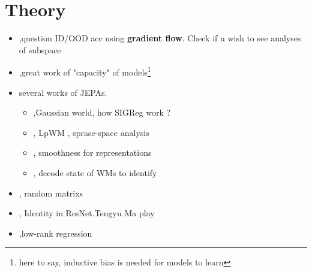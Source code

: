 \section{Theory}
\begin{itemize}
    \item \cite{kumar2022finetuning},question ID/OOD acc using \textbf{gradient flow}. Check if u wish to see analyses of subspace
    \item \cite{papadopoulos2024arrows},great work of "capacity" of models\footnote{here to say, inductive bias is needed for models to learn}
    \item several works of JEPAs.
    \begin{itemize}
        \item \cite{klindt2026when},Gaussian world, how SIGReg work ?
        \item \cite{kuang2026lpwm}, LpWM , sprase-space analysis 
        \item \cite{wang2026temporal}, smoothness for representations
        \item \cite{zhang2026identifiability}, decode state of WMs to identify
    \end{itemize}
    \item \cite{tropp2010userfriendly}, random matrixs
    \item \cite{hardt2016identity}, Identity in ResNet.Tengyu Ma play
    \item \cite{rohde2009estimation},low-rank regression
\end{itemize}

\printbibliography[title=References]


